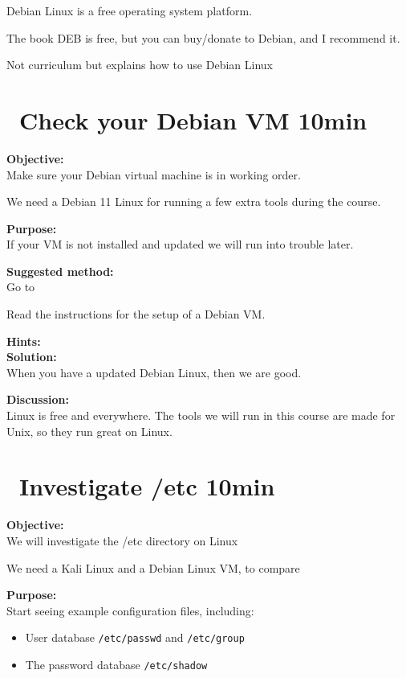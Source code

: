 \documentclass[a4paper,11pt,notitlepage]{report}
\begin{document}
Debian Linux is a free operating system platform.

The book DEB is free, but you can buy/donate to Debian, and I recommend it.

Not curriculum but explains how to use Debian Linux




\chapter{\faExclamationTriangle\ Check your Debian VM 10min}
\label{ex:basicDebianVM}


{\bf Objective:}\\
Make sure your Debian virtual machine is in working order.

We need a Debian 11 Linux for running a few extra tools during the course.


{\bf Purpose:}\\
If your VM is not installed and updated we will run into trouble later.

{\bf Suggested method:}\\
Go to 

Read the instructions for the setup of a Debian VM.

{\bf Hints:}\\

{\bf Solution:}\\
When you have a updated Debian Linux, then we are good.

{\bf Discussion:}\\
Linux is free and everywhere. The tools we will run in this course are made for Unix, so they run great on Linux.



\chapter{\faExclamationTriangle\ Investigate /etc 10min}
\label{ex:basicLinuxetc}


{\bf Objective:}\\
We will investigate the /etc directory on Linux

We need a Kali Linux and a Debian Linux VM, to compare


{\bf Purpose:}\\
Start seeing example configuration files, including:
\begin{itemize}
  \item User database \verb+/etc/passwd+ and \verb+/etc/group+
  \item The password database \verb+/etc/shadow+
\end{itemize}
\end{document}
